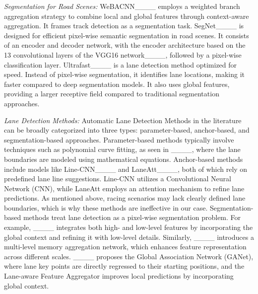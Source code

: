 
\textit{Segmentation for Road Scenes:} WeBACNN____ employs a weighted branch aggregation strategy to combine local and global features through context-aware aggregation. It frames track detection as a segmentation task. SegNet____ is designed for efficient pixel-wise semantic segmentation in road scenes. It consists of an encoder and decoder network, with the encoder architecture based on the 13 convolutional layers of the VGG16 network____, followed by a pixel-wise classification layer. Ultrafast____ is a lane detection method optimized for speed. Instead of pixel-wise segmentation, it identifies lane locations, making it faster compared to deep segmentation models. It also uses global features, providing a larger receptive field compared to traditional segmentation approaches.

\textit{Lane Detection Methods:} Automatic Lane Detection Methods in the literature can be broadly categorized into three types: parameter-based, anchor-based, and segmentation-based approaches. Parameter-based methods typically involve techniques such as polynomial curve fitting, as seen in ____, where the lane boundaries are modeled using mathematical equations. Anchor-based methods include models like Line-CNN____ and LaneAtt____, both of which rely on predefined lane line suggestions. Line-CNN utilizes a Convolutional Neural Network (CNN), while LaneAtt employs an attention mechanism to refine lane predictions. As mentioned above, racing scenarios may lack clearly defined lane boundaries, which is why these methods are ineffective in our case. Segmentation-based methods treat lane detection as a pixel-wise segmentation problem. For example, ____ integrates both high- and low-level features by incorporating the global context and refining it with low-level details. Similarly, ____ introduces a multi-level memory aggregation network, which enhances feature representation across different scales. ____ proposes the Global Association Network (GANet), where lane key points are directly regressed to their starting positions, and the Lane-aware Feature Aggregator improves local predictions by incorporating global context. 

